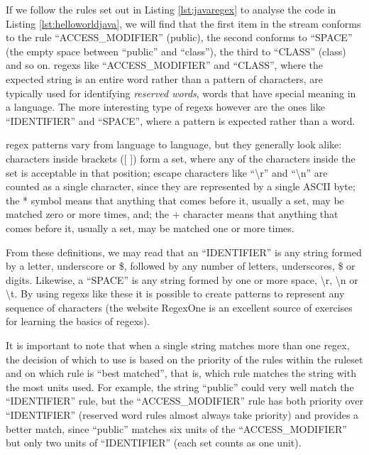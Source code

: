 If we follow the rules set out in Listing \ref{lst:javaregex} to analyse the code in Listing \ref{lst:helloworldjava}, we will find that the first item in the stream conforms to the rule ``ACCESS_MODIFIER'' (public), the second conforms to ``SPACE'' (the empty space between ``public'' and ``class''), the third to ``CLASS'' (class) and so on. \Gls{regex}s like ``ACCESS_MODIFIER'' and ``CLASS'', where the expected string is an entire word rather than a pattern of characters, are typically used for identifying \emph{reserved words}, words that have special meaning in a language. The more interesting type of \gls{regex}s however are the ones like ``IDENTIFIER'' and ``SPACE'', where a pattern is expected rather than a word.

\Gls{regex} patterns vary from language to language, but they generally look alike: characters inside brackets ([ ]) form a set, where any of the characters inside the set is acceptable in that position; escape characters like ``\textbackslash r'' and ``\textbackslash n'' are counted as a single character, since they are represented by a single ASCII byte; the * symbol means that anything that comes before it, usually a set, may be matched zero or more times, and; the + character means that anything that comes before it, usually a set, may be matched one or more times.

From these definitions, we may read that an ``IDENTIFIER'' is any string formed by a letter, underscore or \$, followed by any number of letters, underscores, \$ or digits. Likewise, a ``SPACE'' is any string formed by one or more space, \textbackslash r, \textbackslash n or \textbackslash t. By using \gls{regex}s like these it is possible to create patterns to represent any sequence of characters (the website RegexOne \cite{REGEXONE} is an excellent source of exercises for learning the basics of \gls{regex}s).

It is important to note that when a single string matches more than one \gls{regex}, the decision of which to use is based on the priority of the rules within the ruleset and on which rule is ``best matched'', that is, which rule matches the string with the most units used. For example, the string ``public'' could very well match the ``IDENTIFIER'' rule, but the ``ACCESS_MODIFIER'' rule has both priority over ``IDENTIFIER'' (reserved word rules almost always take priority) and  provides a better match, since ``public'' matches six units of the ``ACCESS_MODIFIER'' but only two units of ``IDENTIFIER'' (each set counts as one unit).

